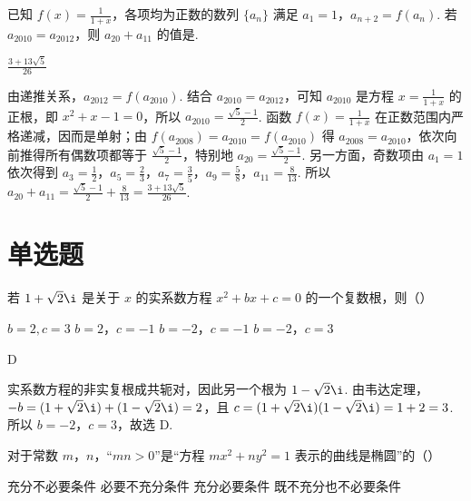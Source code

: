 \begin{problem}
已知 \( f(x) = \frac{1}{1 + x} \)，各项均为正数的数列 \(\{a_n\}\) 满足 \(a_{1} = 1\)，\(a_{n + 2} = f(a_n)\). 若 \( a_{2010} = a_{2012} \)，则 \( a_{20} + a_{11} \) 的值是\fillinblank{}.
\end{problem}

\begin{answer}
\(\frac{3+13\sqrt{5}}{26}\)
\end{answer}

\begin{solution}
由递推关系，\(a_{2012}=f(a_{2010})\). 结合 \(a_{2010}=a_{2012}\)，可知 \(a_{2010}\) 是方程 \(x=\frac{1}{1+x}\) 的正根，即 \(x^2+x-1=0\)，所以 \(a_{2010}=\frac{\sqrt5-1}{2}\). 函数 \(f(x)=\frac{1}{1+x}\) 在正数范围内严格递减，因而是单射；由 \(f(a_{2008})=a_{2010}=f(a_{2010})\) 得 \(a_{2008}=a_{2010}\)，依次向前推得所有偶数项都等于 \(\frac{\sqrt5-1}{2}\)，特别地 \(a_{20}=\frac{\sqrt5-1}{2}\). 另一方面，奇数项由 \(a_1=1\) 依次得到 \(a_3=\frac12\)，\(a_5=\frac23\)，\(a_7=\frac35\)，\(a_9=\frac58\)，\(a_{11}=\frac8{13}\). 所以 \(a_{20}+a_{11}=\frac{\sqrt5-1}{2}+\frac8{13}=\frac{3+13\sqrt5}{26}\).
\end{solution}

\section{单选题}

\begin{problem}
若 \(1 + \sqrt{2}\i\) 是关于 \(x\) 的实系数方程 \(x^{2} + bx + c = 0\) 的一个复数根，则（\quad）

\choices
    {\(b = 2, c = 3\)}
    {\(b = 2\)，\(c = -1\)}
    {\(b = -2\)，\(c = -1\)}
    {\(b = -2\)，\(c = 3\)}
\end{problem}

\begin{answer}
D
\end{answer}

\begin{solution}
实系数方程的非实复根成共轭对，因此另一个根为 \(1-\sqrt2\i\). 由韦达定理，\(-b=(1+\sqrt2\i)+(1-\sqrt2\i)=2\)，且 \(c=(1+\sqrt2\i)(1-\sqrt2\i)=1+2=3\). 所以 \(b=-2\)，\(c=3\)，故选 D.
\end{solution}

\begin{problem}
对于常数 \(m\)，\(n\)，“\(mn > 0\)”是“方程 \(mx^{2} + ny^{2} = 1\) 表示的曲线是椭圆”的（\quad）

\choices
    {充分不必要条件}
    {必要不充分条件}
    {充分必要条件}
    {既不充分也不必要条件}
\end{problem}

